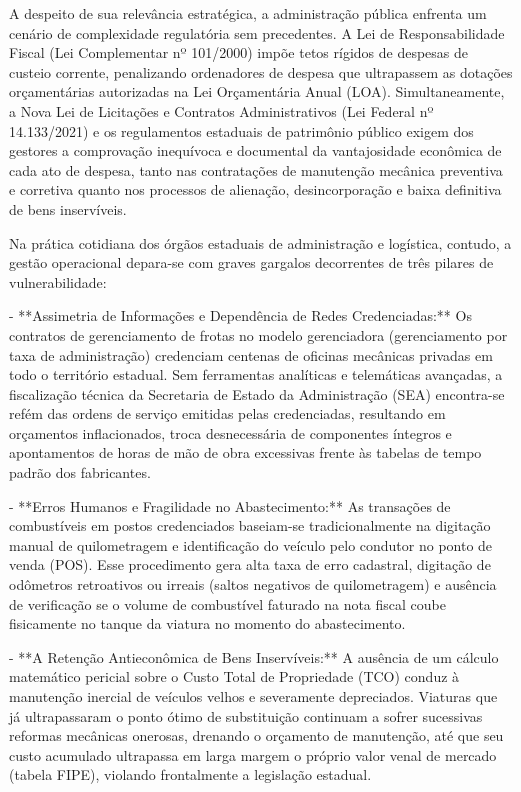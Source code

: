 \documentclass[12pt,a4paper]{article}
\begin{document}
A despeito de sua relevância estratégica, a administração pública enfrenta um cenário de complexidade regulatória sem precedentes. A Lei de Responsabilidade Fiscal (Lei Complementar nº 101/2000) impõe tetos rígidos de despesas de custeio corrente, penalizando ordenadores de despesa que ultrapassem as dotações orçamentárias autorizadas na Lei Orçamentária Anual (LOA). Simultaneamente, a Nova Lei de Licitações e Contratos Administrativos (Lei Federal nº 14.133/2021) e os regulamentos estaduais de patrimônio público exigem dos gestores a comprovação inequívoca e documental da vantajosidade econômica de cada ato de despesa, tanto nas contratações de manutenção mecânica preventiva e corretiva quanto nos processos de alienação, desincorporação e baixa definitiva de bens inservíveis.

Na prática cotidiana dos órgãos estaduais de administração e logística, contudo, a gestão operacional depara-se com graves gargalos decorrentes de três pilares de vulnerabilidade:

- **Assimetria de Informações e Dependência de Redes Credenciadas:** Os contratos de gerenciamento de frotas no modelo gerenciadora (gerenciamento por taxa de administração) credenciam centenas de oficinas mecânicas privadas em todo o território estadual. Sem ferramentas analíticas e telemáticas avançadas, a fiscalização técnica da Secretaria de Estado da Administração (SEA) encontra-se refém das ordens de serviço emitidas pelas credenciadas, resultando em orçamentos inflacionados, troca desnecessária de componentes íntegros e apontamentos de horas de mão de obra excessivas frente às tabelas de tempo padrão dos fabricantes.

- **Erros Humanos e Fragilidade no Abastecimento:** As transações de combustíveis em postos credenciados baseiam-se tradicionalmente na digitação manual de quilometragem e identificação do veículo pelo condutor no ponto de venda (POS). Esse procedimento gera alta taxa de erro cadastral, digitação de odômetros retroativos ou irreais (saltos negativos de quilometragem) e ausência de verificação se o volume de combustível faturado na nota fiscal coube fisicamente no tanque da viatura no momento do abastecimento.

- **A Retenção Antieconômica de Bens Inservíveis:** A ausência de um cálculo matemático pericial sobre o Custo Total de Propriedade (TCO) conduz à manutenção inercial de veículos velhos e severamente depreciados. Viaturas que já ultrapassaram o ponto ótimo de substituição continuam a sofrer sucessivas reformas mecânicas onerosas, drenando o orçamento de manutenção, até que seu custo acumulado ultrapassa em larga margem o próprio valor venal de mercado (tabela FIPE), violando frontalmente a legislação estadual.
\end{document}
